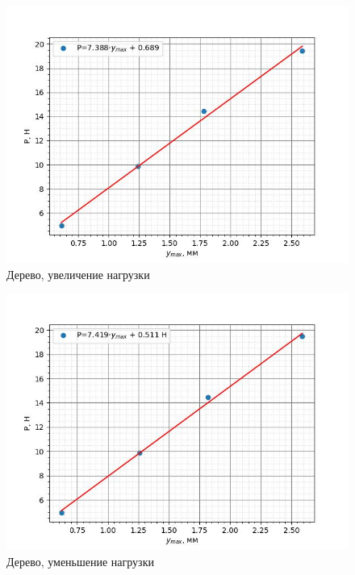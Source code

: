 \documentclass[a4paper,12 pt]{article}
\begin{document}
\begin{enumerate}
    \begin{figure}[H]
        \centering
        \includegraphics[scale = 0.7]{WoodUp.jpg}
        \caption{Дерево, увеличение нагрузки}
    \end{figure}
    \begin{figure}[H]
        \centering
        \includegraphics[scale=0.7]{WoodDown.jpg}
        \caption{Дерево, уменьшение нагрузки}
    \end{figure}


\end{enumerate}
\end{document}
